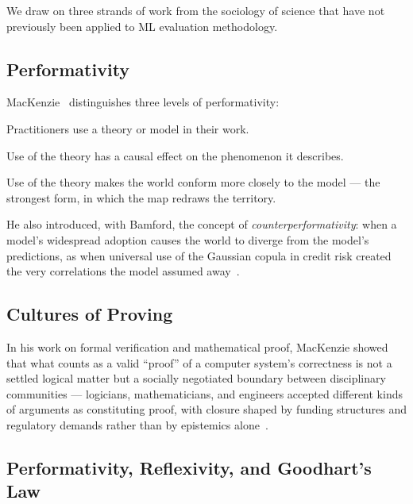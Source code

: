 \documentclass{article}
\begin{document}
We draw on three strands of work from the sociology of science that have not previously been applied to ML evaluation methodology.

\subsection{Performativity}

MacKenzie~\citep{mackenzie_engine_2006} distinguishes three levels of performativity:

\begin{description}[leftmargin=1.5cm]
  \item[Generic] Practitioners use a theory or model in their work.
  \item[Effective] Use of the theory has a causal effect on the phenomenon it describes.
  \item[Barnesian] Use of the theory makes the world conform more closely to the model --- the strongest form, in which the map redraws the territory.
\end{description}

He also introduced, with Bamford, the concept of \textit{counterperformativity}: when a model's widespread adoption causes the world to diverge from the model's predictions, as when universal use of the Gaussian copula in credit risk created the very correlations the model assumed away~\citep{mackenzie_bamford_2018}.

\subsection{Cultures of Proving}

In his work on formal verification and mathematical proof, MacKenzie showed that what counts as a valid ``proof'' of a computer system's correctness is not a settled logical matter but a socially negotiated boundary between disciplinary communities --- logicians, mathematicians, and engineers accepted different kinds of arguments as constituting proof, with closure shaped by funding structures and regulatory demands rather than by epistemics alone~\citep{mackenzie_mechanizing_2001}.

\subsection{Performativity, Reflexivity, and Goodhart's Law}
\end{document}
